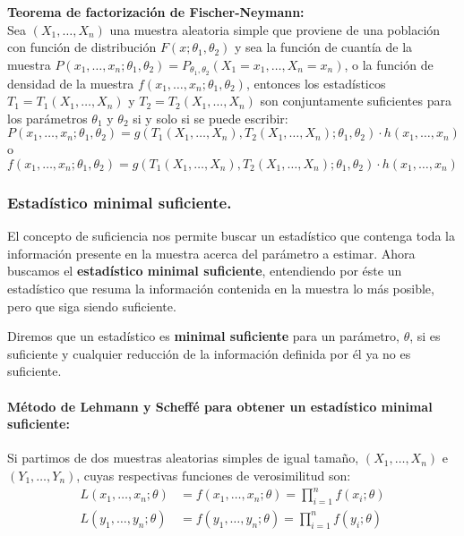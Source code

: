 \begin{teorema}
\textbf{Teorema de factorizaci\'on de Fischer-Neymann:}\\
Sea $(X_1,\ldots,X_n)$ una muestra aleatoria simple que proviene de una poblaci\'on con funci\'on de distribuci\'on $F(x;\theta_1,\theta_2)$ y sea la funci\'on de cuant\'ia de la muestra $P(x_1,\ldots,x_n;\theta_1,\theta_2)=P_{\theta_1,\theta_2}(X_1=x_1,\ldots,X_n=x_n)$, o la funci\'on de densidad de la muestra $f(x_1,\ldots,x_n;\theta_1,\theta_2)$, entonces los estad\'isticos $T_1=T_1(X_1,\ldots,X_n)$ y $T_2=T_2(X_1,\ldots,X_n)$ son conjuntamente suficientes para los par\'ametros $\theta_1$ y $\theta_2$ si y solo si se puede escribir:
\begin{equation*}
P(x_1,\ldots,x_n;\theta_1,\theta_2)=g(T_1(X_1,\ldots,X_n),T_2(X_1,\ldots,X_n);\theta_1,\theta_2)\cdot h(x_1,\ldots,x_n)
\end{equation*}
o
\begin{equation*}
f(x_1,\ldots,x_n;\theta_1,\theta_2)=g(T_1(X_1,\ldots,X_n),T_2(X_1,\ldots,X_n);\theta_1,\theta_2)\cdot h(x_1,\ldots,x_n)
\end{equation*}
\end{teorema}

\subsubsection{Estad\'istico minimal suficiente.}
El concepto de suficiencia nos permite buscar un estad\'istico que contenga toda la informaci\'on presente en la muestra acerca del par\'ametro a estimar. Ahora buscamos el \textbf{estad\'istico minimal suficiente}, entendiendo por \'este un estad\'istico que resuma la informaci\'on contenida en la muestra lo m\'as posible, pero que siga siendo suficiente.

\begin{definicion}
Diremos que un estad\'istico es \textbf{minimal suficiente} para un par\'ametro, $\theta$, si es suficiente y cualquier reducci\'on de la informaci\'on definida por \'el ya no es suficiente.
\end{definicion}

\paragraph{M\'etodo de Lehmann y Scheff\'e para obtener un estad\'istico minimal suficiente:}
Si partimos de dos muestras aleatorias simples de igual tama\~no, $(X_1,\ldots,X_n)$ e $(Y_1,\ldots,Y_n)$, cuyas respectivas funciones de verosimilitud son:
\begin{align*}
L(x_1,\ldots,x_n;\theta)&=f(x_1,\ldots,x_n;\theta)=\prod_{i=1}^nf(x_i;\theta) \\
L(y_1,\ldots,y_n;\theta)&=f(y_1,\ldots,y_n;\theta)=\prod_{i=1}^nf(y_i;\theta)
\end{align*}

